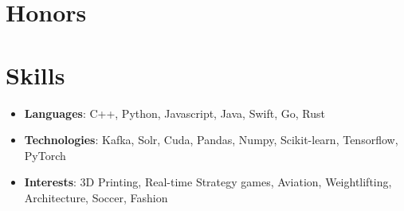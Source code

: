 \documentclass[letterpaper,11pt]{article}
\newcommand{\resumeItem}[2]{
  \item\small{
    \textbf{#1}{: #2\vspace{-2pt}}
  }
}
\newcommand{\resumeSubItem}[2]{\resumeItem{#1}{#2}\vspace{-5pt}}
\newcommand{\resumeSubHeadingListStart}{\begin{itemize}[leftmargin=*]}
\newcommand{\resumeSubHeadingListEnd}{\end{itemize}}
\begin{document}
%

\section{Honors}
  \resumeSubHeadingListStart
  \iftoggle{Finance}{
    \resumeSubItem{Published}{Paper on detecting Parkinson's diseases using handrwriting samples at {\bf MIT IEEE URTC}}
    \resumeSubItem{IOI}{Qualified for Indian National Olympiad in Informatics: programming contest for selecting India's IOI team}
    \resumeSubItem{Jane Street SEE}{Among 32 students selected nationally for quant education program, played electronic trading games, attended lectures on Bayesian thinking, market-making, arbitrage, biases}
    \resumeSubItem{D.E. Shaw Nexus Fellowship}{Selected for sophomore fellowship program of about 30 students}
  }{
    \resumeSubItem{D.E. Shaw Nexus Fellowship}{Selected for sophomore fellowship program of about 30 students}
    \resumeSubItem{IOI}{Qualified for Indian National Olympiad in Informatics: programming contest for selecting India's IOI team}
    \resumeSubItem{MIT IEEE}{Paper on detecting Parkinson's diseases using recurrent neural networks at {\bf MIT IEEE URTC}}
    \resumeSubItem{Winner}{Enterpreneurship summit organized by University of Melbourne and ASES, Stanford University}
  }
  \resumeSubHeadingListEnd


\section{Skills}
 \resumeSubHeadingListStart
  \resumeSubItem{Languages}{C++, Python, Javascript, Java, Swift, Go, Rust}
  \resumeSubItem{Technologies}{Kafka, Solr, Cuda, Pandas, Numpy, Scikit-learn, Tensorflow, PyTorch}
  \resumeSubItem{Interests}{3D Printing, Real-time Strategy games, Aviation, Weightlifting, Architecture, Soccer, Fashion}
 \resumeSubHeadingListEnd


\end{document}
